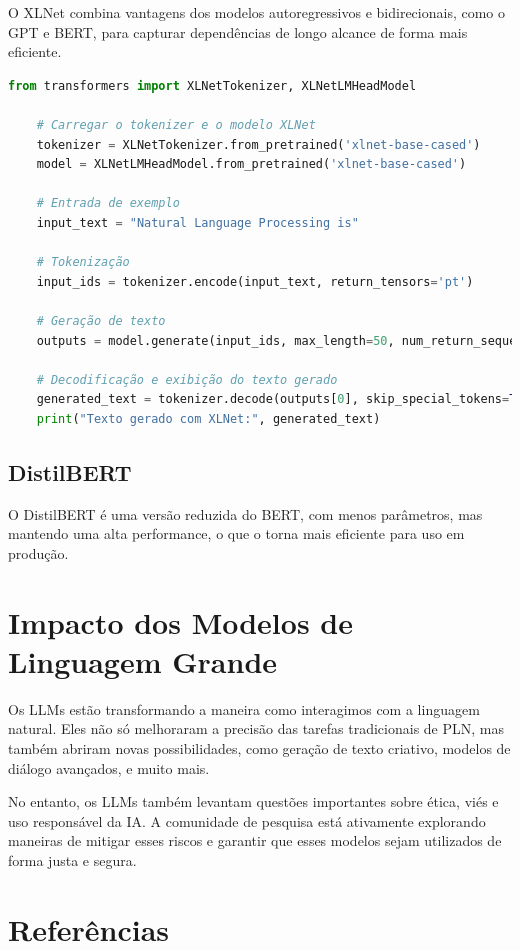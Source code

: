 \documentclass[14pt,a4paper,oneside]{book}
\begin{document}
O XLNet combina vantagens dos modelos autoregressivos e bidirecionais, como o GPT e BERT, para capturar dependências de longo alcance de forma mais eficiente.

\begin{lstlisting}[language=Python]
	from transformers import XLNetTokenizer, XLNetLMHeadModel
	
	# Carregar o tokenizer e o modelo XLNet
	tokenizer = XLNetTokenizer.from_pretrained('xlnet-base-cased')
	model = XLNetLMHeadModel.from_pretrained('xlnet-base-cased')
	
	# Entrada de exemplo
	input_text = "Natural Language Processing is"
	
	# Tokenização
	input_ids = tokenizer.encode(input_text, return_tensors='pt')
	
	# Geração de texto
	outputs = model.generate(input_ids, max_length=50, num_return_sequences=1)
	
	# Decodificação e exibição do texto gerado
	generated_text = tokenizer.decode(outputs[0], skip_special_tokens=True)
	print("Texto gerado com XLNet:", generated_text)
\end{lstlisting}

\subsection{DistilBERT}

O DistilBERT é uma versão reduzida do BERT, com menos parâmetros, mas mantendo uma alta performance, o que o torna mais eficiente para uso em produção.

\section{Impacto dos Modelos de Linguagem Grande}

Os LLMs estão transformando a maneira como interagimos com a linguagem natural. Eles não só melhoraram a precisão das tarefas tradicionais de PLN, mas também abriram novas possibilidades, como geração de texto criativo, modelos de diálogo avançados, e muito mais.

No entanto, os LLMs também levantam questões importantes sobre ética, viés e uso responsável da IA. A comunidade de pesquisa está ativamente explorando maneiras de mitigar esses riscos e garantir que esses modelos sejam utilizados de forma justa e segura.

\section{Referências}
\end{document}
